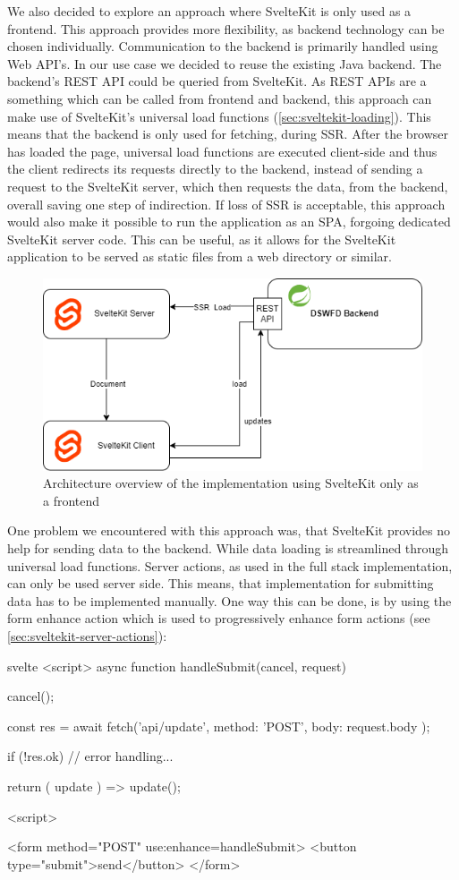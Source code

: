 We also decided to explore an approach where SvelteKit is only used as a frontend. This approach provides more flexibility, as backend technology can be chosen individually. Communication to the backend is primarily handled using Web API's. In our use case we decided to reuse the existing Java backend. The backend's REST API could be queried from SvelteKit. As REST APIs are a something which can be called from frontend and backend, this approach can make use of SvelteKit's universal load functions (\ref{sec:sveltekit-loading}). This means that the backend is only used for fetching, during SSR. After the browser has loaded the page, universal load functions are executed client-side and thus the client redirects its requests directly to the backend, instead of sending  a request to the SvelteKit server, which then requests the data, from the backend, overall saving one step of indirection. If loss of SSR is acceptable, this approach would also make it possible to run the application as an SPA, forgoing dedicated SvelteKit server code. This can be useful, as it allows for the SvelteKit application to be served as static files from a web directory or similar. 

\begin{figure}[ht]
    \centering
    \includegraphics[width=.6\linewidth]{assets/fe-only-client-takes-over}
    \caption{Architecture overview of the implementation using SvelteKit only as a frontend}
    \label{fig:dswfd-architecture-fe-only}
\end{figure}

One problem we encountered with this approach was, that SvelteKit provides no help for sending data to the backend. While data loading is streamlined through universal load functions. Server actions, as used in the full stack implementation, can only be used server side. This means, that implementation for submitting data has to be implemented manually. One way this can be done, is by using the form enhance action which is used to progressively enhance form actions (see \ref{sec:sveltekit-server-actions}):

\begin{myminted}{svelte}{}
<script>
    async function handleSubmit({cancel, request}) {
        cancel();

        const res = await fetch('api/update', {
            method: 'POST',
            body: request.body
        });

        if (!res.ok) {
            // error handling...
        }

        return ({ update }) => {
            update();
        }
    }
<script>

<form method="POST" use:enhance={handleSubmit}>
    <button type="submit">send</button>
</form>
\end{myminted}

